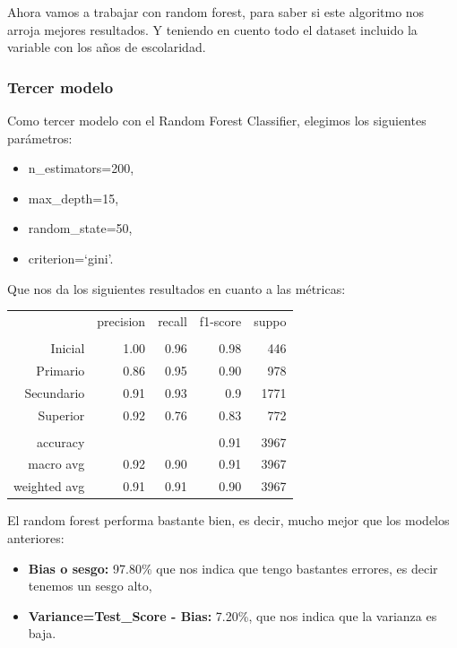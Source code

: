 \documentclass[a4paper]{article}
\begin{document}
        Ahora vamos a trabajar con random forest, para saber si este algoritmo nos arroja mejores resultados. Y teniendo en cuento todo el dataset incluido la variable con los años de escolaridad. 

        \subsubsection{Tercer modelo}

            Como tercer modelo con el Random Forest Classifier, elegimos los siguientes parámetros:
            \begin{itemize}
                \item n\_estimators=200,
                \item max\_depth=15,
                \item random\_state=50,
                \item criterion=`gini'.
            \end{itemize}

            Que nos da los siguientes resultados en cuanto a las métricas:
            \begin{table}[H]
                \centering
                \begin{tabular}{rrrrr}
                    ~ & precision & recall & f1-score & suppo \\
                    & & & & \\
                    Inicial    & 1.00 & 0.96 & 0.98 & 446 \\
                    Primario   & 0.86 & 0.95 & 0.90 & 978 \\
                    Secundario & 0.91 & 0.93 & 0.9 & 1771 \\
                    Superior   & 0.92 & 0.76 & 0.83 & 772 \\
                    & & & & \\
                    accuracy & & & 0.91 & 3967 \\
                    macro avg & 0.92 & 0.90 & 0.91 & 3967 \\
                    weighted avg & 0.91 & 0.91 & 0.90 & 3967 \\
                \end{tabular}
            \end{table}

             El random forest performa bastante bien, es decir, mucho mejor que los modelos anteriores:
             \begin{itemize}
                \item \textbf{Bias o sesgo:} 97.80\% que nos indica que tengo bastantes errores, es decir tenemos un sesgo alto,
                \item \textbf{Variance=Test\_Score - Bias:} 7.20\%, que nos indica que la varianza es baja.
             \end{itemize}
\end{document}
